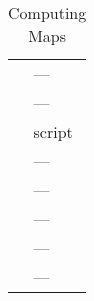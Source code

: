 \begin{table}
{\begin{subfloatrow}
{\begin{tabular}{@{}m{}m{}@{}}
					\textcite{elkamel_experimental_2011} & ---\\
					\textcite{ewert_modellierung_2013} & ---\\
					\textcite{freeman_compressor_2011} & \mtlb{} script\\
					\textcite{hansch_untersuchung_2010} & ---\\
					\textcite{harley_inlet_2014} & ---\\
					\textcite{luddecke_engine_2014} & ---\\
					\textcite{kurzke_correlations_2011} & ---\\
					\textcite{schwarz_considerations_2014} & ---\\
					\bottomrule
				\end{tabular}
			}%
			{%
				\caption{Computing Maps}%
				\label{tab:works_computing_maps}%
			}%
		\end{subfloatrow}
		
}
\end{table}
